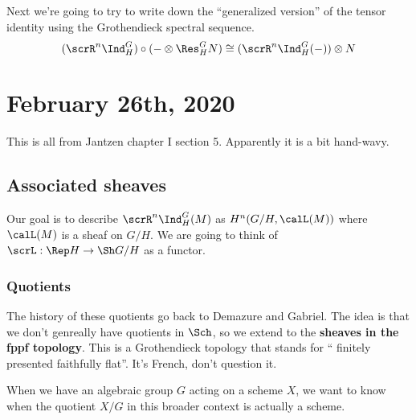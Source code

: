 \documentclass[12pt]{article}
\begin{document}
Next we're going to try to write down the ``generalized version'' of the tensor identity using the Grothendieck spectral sequence.
\[(\scrR^n\Ind_H^G)\circ(-\otimes \Res^G_H N)\cong (\scrR^n\Ind_H^G(-))\otimes N\]

\section{February 26th, 2020}
This is all from Jantzen chapter I section 5. Apparently it is a bit hand-wavy.
\subsection{Associated sheaves}
Our goal is to describe $\scrR^n\Ind_H^G(M)$ as $H^n(G/H,\calL(M))$ where $\calL(M)$ is a sheaf on $G/H$.
We are going to think of $\scrL:\Rep H\to \Sh G/H$ as a functor.

\subsubsection{Quotients}
The history of these quotients go back to Demazure and Gabriel. The idea is that we don't genreally have 
quotients in $\Sch$, so we extend to the \textbf{sheaves in the fppf topology}. This is a Grothendieck topology that stands for ``
finitely presented faithfully flat''. It's French, don't question it.

When we have an algebraic group $G$ acting on a scheme $X$, we want to know when the quotient $X/G$ in this broader context 
is actually a scheme. 
\end{document}
